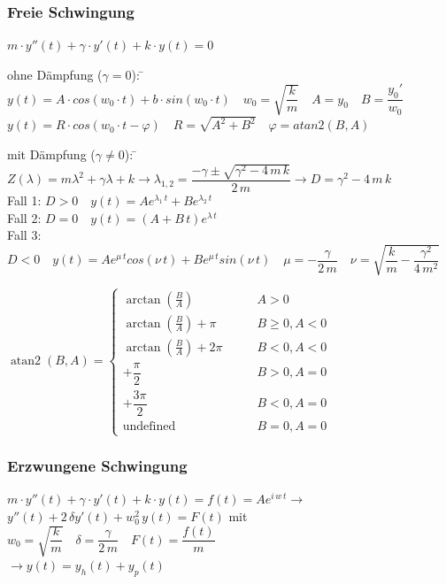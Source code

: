 \subsubsection{Freie Schwingung}
$m \cdot y''(t) + \gamma\cdot y'(t) + k \cdot y(t) = 0$\\
\begin{tabbing}
ohne Dämpfung ($\gamma = 0$): \= $y(t) = A \cdot cos(w_0 \cdot t) + b\cdot sin(w_0 \cdot t) \quad w_0=\sqrt{\dfrac{k}{m}} \quad  A=y_0 \quad B=\dfrac{y_0'}{w_0}$\\
\>$y(t) =R\cdot cos(w_0 \cdot t - \varphi) \quad R=\sqrt{A^2+B^2} \quad \varphi=atan2(B,A)$\\
\end{tabbing}

\begin{tabbing}
mit Dämpfung ($\gamma \neq 0$): \= $Z(\lambda)=m\lambda^2 + \gamma \lambda + k \rightarrow \lambda_{1,2}=\dfrac{-\gamma \pm \sqrt{\gamma^2 - 4 \, m \, k}}{2 \, m} \rightarrow D=\gamma^2 - 4 \, m \, k$\\
\> Fall 1: $D>0 \quad y(t)=Ae^{\lambda_1 \, t} + Be^{\lambda_2 \, t}$\\
\> Fall 2: $D=0 \quad y(t)=(A + B \,t)e^{\lambda \, t}$\\
\> Fall 3: $D<0 \quad y(t)=Ae^{\mu \, t}cos(\nu \, t) + Be^{\mu \, t}sin(\nu \, t) \quad \mu=-\dfrac{\gamma}{2\,m} \quad \nu = \sqrt{\dfrac{k}{m}-\dfrac{\gamma^2}{4 \, m^2}}$
\end{tabbing}

$\operatorname{atan2}(B, A) = \begin{cases}
\arctan\left(\frac B A\right) & \qquad A > 0 \\
\arctan\left(\frac B A\right) + \pi& \qquad B \ge 0 , A < 0 \\
\arctan\left(\frac B A\right) + 2\pi& \qquad B < 0 , A < 0 \\
+\dfrac{\pi}{2} & \qquad B > 0 , A = 0 \\
+\dfrac{3\pi}{2} & \qquad B < 0 , A = 0 \\
\text{undefined} & \qquad B = 0, A = 0
\end{cases}$

\subsubsection{Erzwungene Schwingung}
$m \cdot y''(t) + \gamma\cdot y'(t) + k \cdot y(t) = f(t)=Ae^{i\,w\,t} \rightarrow$\\
$ y''(t) + 2 \, \delta y'(t) + w_0^2 \, y(t) = F(t)$ mit $w_0=\sqrt{\dfrac{k}{m}} \quad \delta=\dfrac{\gamma}{2\,m} \quad F(t)=\dfrac{f(t)}{m}$\\
$\rightarrow y(t)=y_h(t)+y_p(t)$

